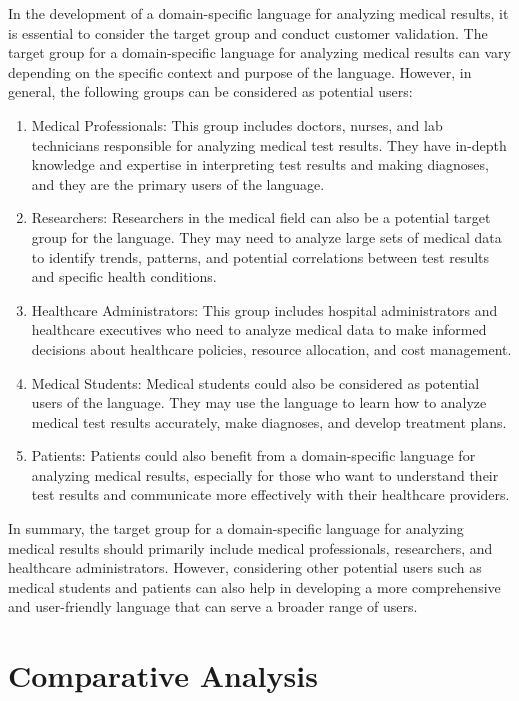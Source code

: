 In the development of a domain-specific language for analyzing medical results, it is essential to consider the target group and conduct customer validation. The target group for a domain-specific language for analyzing medical results can vary depending on the specific context and purpose of the language. However, in general, the following groups can be considered as potential users:
\begin{enumerate}
\item Medical Professionals: This group includes doctors, nurses, and lab technicians responsible for analyzing medical test results. They have in-depth knowledge and expertise in interpreting test results and making diagnoses, and they are the primary users of the language.

\item Researchers: Researchers in the medical field can also be a potential target group for the language. They may need to analyze large sets of medical data to identify trends, patterns, and potential correlations between test results and specific health conditions.

\item Healthcare Administrators: This group includes hospital administrators and healthcare executives who need to analyze medical data to make informed decisions about healthcare policies, resource allocation, and cost management.

\item Medical Students: Medical students could also be considered as potential users of the language. They may use the language to learn how to analyze medical test results accurately, make diagnoses, and develop treatment plans.

\item Patients: Patients could also benefit from a domain-specific language for analyzing medical results, especially for those who want to understand their test results and communicate more effectively with their healthcare providers.
\end{enumerate}
In summary, the target group for a domain-specific language for analyzing medical results should primarily include medical professionals, researchers, and healthcare administrators. However, considering other potential users such as medical students and patients can also help in developing a more comprehensive and user-friendly language that can serve a broader range of users.

\vspace{0.5cm}
\section{Comparative Analysis}

